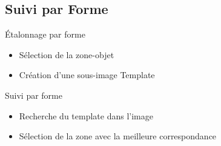 \documentclass{beamer}
\begin{document}
		\subsection{Suivi par Forme}
		\begin{frame}{Étalonnage par forme}
			\begin{itemize}
				\item{Sélection de la zone-objet}
				\item{Création d'une sous-image Template}
			\end{itemize}
		\end{frame}

		\begin{frame}{Suivi par forme}
			\begin{itemize}
				\item{Recherche du template dans l'image}
				\item{Sélection de la zone avec la meilleure correspondance}
			\end{itemize}
		\end{frame}
\end{document}
